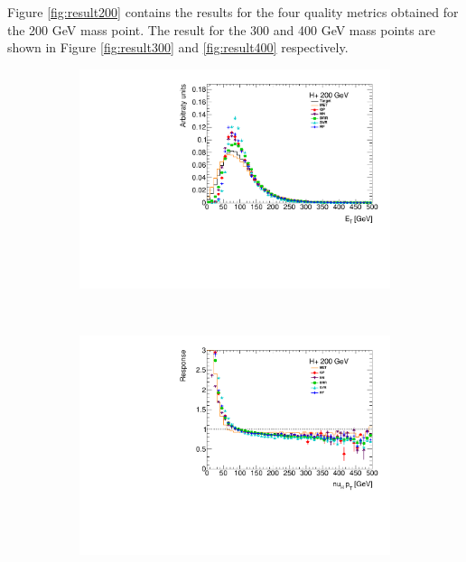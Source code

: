 \documentclass[twocolumn]{scrartcl}
\begin{document}
Figure \ref{fig:result200} contains the results for the four quality metrics obtained for the 200 GeV mass point. The result for the 300 and 400 GeV mass points are shown in Figure \ref{fig:result300} and \ref{fig:result400} respectively.

\begin{figure}
    \centering
    \begin{subfigure}{.48\textwidth}
        \includegraphics[width=\textwidth]{plots/pt_200.pdf}
    \end{subfigure}
    ~
    \begin{subfigure}{.48\textwidth}
        \includegraphics[width=\textwidth]{plots/profile_200.pdf}
    \end{subfigure}


\end{figure}
\end{document}
